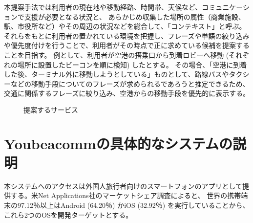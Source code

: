 \documentclass[11pt,papersize]{jsbook}
\begin{document}
本提案手法では利用者の現在地や移動経路、時間帯、天候など、コミュニケーションで支援が必要となる状況と、
あらかじめ収集した場所の属性（商業施設、駅、市役所など）やその周辺の状況などを総合して、「コンテキスト」と呼ぶ。
それらをもとに利用者の置かれている環境を把握し、フレーズや単語の絞り込みや優先度付けを行うことで、利用者がその時点で正に求めている候補を提案することを目指す。
例として、利用者が空港の搭乗口から到着ロビーへ移動 (それぞれの場所に設置したビーコンを順に検知) したとする。
その場合、「空港に到着した後、ターミナル外に移動しようとしている」ものとして、路線バスやタクシーなどの移動手段についてのフレーズが求められるであろうと推定できるため、
交通に関係するフレーズに絞り込み、空港からの移動手段を優先的に表示する。
\begin{figure}[htbp]
 \begin{center}
 \end{center}
 \caption{提案するサービス}
 \label{fig:use_flow}
\end{figure}

\section{Youbeacommの具体的なシステムの説明}\label{sec:yonnoni}
 本システムへのアクセスは外国人旅行者向けのスマートフォンのアプリとして提供する。米Net Applications社のマーケットシェア調査\cite{b}によると、
世界の携帯端末の97.12％以上はAndroid (64.20％) かiOS (32.92％) を実行していることから、これら2つのOSを開発ターゲットとする。
\end{document}
